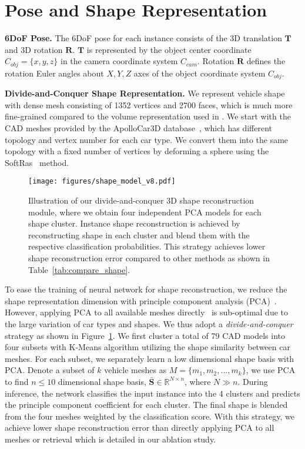 \documentclass[runningheads]{llncs}
\newcommand{\bR}{\mathbf}
\begin{document}
\section{Pose and Shape Representation}
\label{sec:representation} 
\smallskip\noindent\textbf{6DoF Pose.}
The 6DoF pose for each instance consists of the 3D translation $\mathbf{T}$ and 3D rotation $\mathbf{R}$. $\bR{T}$ is represented by the object center coordinate ${C}_{obj}=\{x,y,z\}$ in the camera coordinate system ${C}_{cam}$.
Rotation $\mathbf{R}$  defines the rotation Euler angles about ${X,Y,Z}$ axes of the object coordinate system ${C}_{obj}$.

\smallskip\noindent\textbf{Divide-and-Conquer Shape Representation.} 
We represent vehicle shape with dense mesh consisting of 1352 vertices and 2700 faces, which is much more fine-grained compared to the volume representation used in \cite{kundu20183d}. We start with the CAD meshes provided by the ApolloCar3D database~\cite{song2019apollocar3d}, which has different topology and vertex number for each car type. We convert them into the same topology with a fixed number of vertices by deforming a sphere using the SoftRas~\cite{liu2019soft} method.

\begin{figure}[!t]
	\centering
	\texttt{[image: figures/shape\_model\_v8.pdf]}
	\caption{Illustration of our divide-and-conquer 3D shape reconstruction module, where we obtain four independent PCA models for each shape cluster. Instance shape reconstruction is achieved by reconstructing shape in each cluster and blend them with the respective classification probabilities. This strategy achieves lower shape reconstruction error compared to other methods as shown in Table~\ref{tab:compare_shape}.}
	\label{fig:example2}
\end{figure}

To ease the training of neural network for shape reconstruction, we reduce the shape representation dimension with principle component analysis (PCA)~\cite{prisacariu2011nonlinear}. However, applying PCA to all available meshes directly~\cite{engelmann2017samp,leotta2010vehicle,leotta2009predicting} is sub-optimal due to the large variation of car types and shapes. We thus adopt a \textit{divide-and-conquer} strategy as shown in Figure~\ref{fig:example2}. We first cluster a total of 79 CAD models into four subsets with K-Means algorithm utilizing the shape similarity between car meshes. For each subset, we separately learn a low dimensional shape basis with PCA.
Denote a subset of $k$ vehicle meshes as $M = \{m_1,m_2,...,m_k\}$, we use PCA to find $n\leq10$ dimensional shape basis, $\bar{\bR{S}} \in \mathbb{R}^{N\times n}$, where $N \gg n$.
During inference, the network classifies the input instance into the 4 clusters and predicts the principle component coefficient for each cluster. The final shape is blended from the four meshes weighted by the classification score. With this strategy, we achieve lower shape reconstruction error than directly applying PCA to all meshes or retrieval which is detailed in our ablation study.
\label{sec:pca} 
\end{document}
